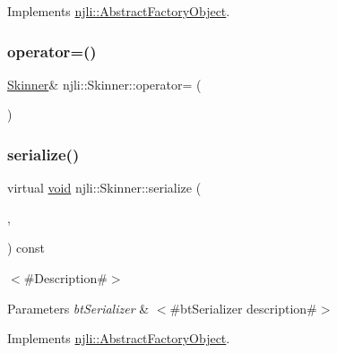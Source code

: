 Implements \mbox{\hyperlink{classnjli_1_1_abstract_factory_object_a838f4fa7e65cace6098aab5222892942}{njli\+::\+Abstract\+Factory\+Object}}.

\mbox{\label{classnjli_1_1_skinner_ad9d630dddb556f8855c126e6892eb25a}} 
\subsubsection{\texorpdfstring{operator=()}{operator=()}}
{\footnotesize\ttfamily \mbox{\hyperlink{classnjli_1_1_skinner}{Skinner}}\& njli\+::\+Skinner\+::operator= (\begin{DoxyParamCaption}\item[{const \mbox{\hyperlink{classnjli_1_1_skinner}{Skinner}} \&}]{ }\end{DoxyParamCaption})\hspace{0.3cm}{\ttfamily [protected]}}

\mbox{\label{classnjli_1_1_skinner_ad70231f29258b02bd8a64701b4535856}} 
\subsubsection{\texorpdfstring{serialize()}{serialize()}}
{\footnotesize\ttfamily virtual \mbox{\hyperlink{_thread_8h_af1e856da2e658414cb2456cb6f7ebc66}{void}} njli\+::\+Skinner\+::serialize (\begin{DoxyParamCaption}\item[{\mbox{\hyperlink{_thread_8h_af1e856da2e658414cb2456cb6f7ebc66}{void}} $\ast$}]{,  }\item[{bt\+Serializer $\ast$}]{ }\end{DoxyParamCaption}) const\hspace{0.3cm}{\ttfamily [virtual]}}

$<$\#\+Description\#$>$


\begin{DoxyParams}{Parameters}
{\em bt\+Serializer} & $<$\#bt\+Serializer description\#$>$ \\
\hline
\end{DoxyParams}


Implements \mbox{\hyperlink{classnjli_1_1_abstract_factory_object_aad2fbe86fb3bdecf02918a96b9c57976}{njli\+::\+Abstract\+Factory\+Object}}.

